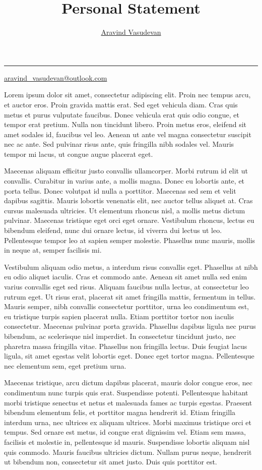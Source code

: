 \documentclass[12pt, a4paper]{article}
\title{Personal Statement}
\author{\href{https://aravindvasudev.github.io/}{Aravind Vasudevan}}
\makeatletter
\newcommand{\email}{\href{mailto:aravind_vasudevan@outlook.com}{aravind\_vasudevan@outlook.com}}
\renewcommand{\maketitle}{
  \begin{center}
    {\Huge \scshape \@title}
    \rule{\linewidth}{0.5mm}
    {\normalsize \@author \hfill \email}
  \end{center}
}
\makeatother
\begin{document}
\maketitle


 Lorem ipsum dolor sit amet, consectetur adipiscing elit. Proin nec tempus arcu, et auctor eros. Proin gravida mattis erat. Sed eget vehicula diam. Cras quis metus et purus vulputate faucibus. Donec vehicula erat quis odio congue, et tempor erat pretium. Nulla non tincidunt libero. Proin metus eros, eleifend sit amet sodales id, faucibus vel leo. Aenean ut ante vel magna consectetur suscipit nec ac ante. Sed pulvinar risus ante, quis fringilla nibh sodales vel. Mauris tempor mi lacus, ut congue augue placerat eget.

Maecenas aliquam efficitur justo convallis ullamcorper. Morbi rutrum id elit ut convallis. Curabitur in varius ante, a mollis magna. Donec eu lobortis ante, et porta tellus. Donec volutpat id nulla a porttitor. Maecenas sed sem et velit dapibus sagittis. Mauris lobortis venenatis elit, nec auctor tellus aliquet at. Cras cursus malesuada ultricies. Ut elementum rhoncus nisl, a mollis metus dictum pulvinar. Maecenas tristique eget orci eget ornare. Vestibulum rhoncus, lectus eu bibendum eleifend, nunc dui ornare lectus, id viverra dui lectus ut leo. Pellentesque tempor leo at sapien semper molestie. Phasellus nunc mauris, mollis in neque at, semper facilisis mi.

Vestibulum aliquam odio metus, a interdum risus convallis eget. Phasellus at nibh eu odio aliquet iaculis. Cras et commodo ante. Aenean sit amet nulla sed enim varius convallis eget sed risus. Aliquam faucibus nulla lectus, at consectetur leo rutrum eget. Ut risus erat, placerat sit amet fringilla mattis, fermentum in tellus. Mauris semper, nibh convallis consectetur porttitor, urna leo condimentum est, eu tristique turpis sapien placerat nulla. Etiam porttitor tortor non iaculis consectetur. Maecenas pulvinar porta gravida. Phasellus dapibus ligula nec purus bibendum, ac scelerisque nisl imperdiet. In consectetur tincidunt justo, nec pharetra massa fringilla vitae. Phasellus non fringilla lectus. Duis feugiat lacus ligula, sit amet egestas velit lobortis eget. Donec eget tortor magna. Pellentesque nec elementum sem, eget pretium urna.

Maecenas tristique, arcu dictum dapibus placerat, mauris dolor congue eros, nec condimentum nunc turpis quis erat. Suspendisse potenti. Pellentesque habitant morbi tristique senectus et netus et malesuada fames ac turpis egestas. Praesent bibendum elementum felis, et porttitor magna hendrerit id. Etiam fringilla interdum urna, nec ultrices ex aliquam ultrices. Morbi maximus tristique orci et tempus. Sed ornare est metus, id congue erat dignissim vel. Etiam sem massa, facilisis et molestie in, pellentesque id mauris. Suspendisse lobortis aliquam nisl quis commodo. Mauris faucibus ultricies dictum. Nullam purus neque, hendrerit ut bibendum non, consectetur sit amet justo. Duis quis porttitor est.
\end{document}
